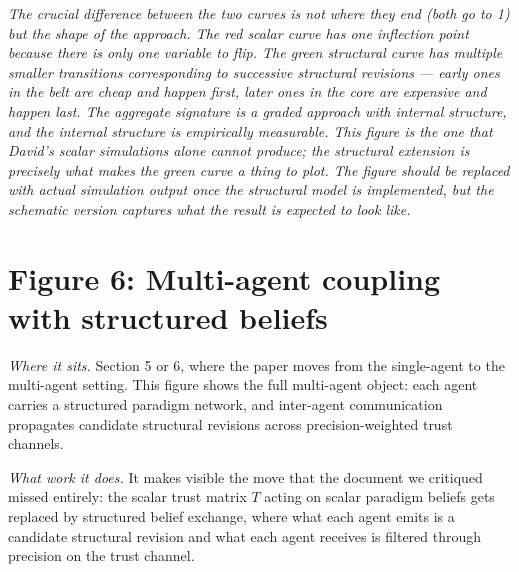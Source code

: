 \documentclass[11pt]{article}
\begin{document}
\noindent\textit{\textcolor{notegrey}{The crucial difference between the two curves is not where they end (both go to 1) but the shape of the approach. The red scalar curve has one inflection point because there is only one variable to flip. The green structural curve has multiple smaller transitions corresponding to successive structural revisions — early ones in the belt are cheap and happen first, later ones in the core are expensive and happen last. The aggregate signature is a graded approach with internal structure, and the internal structure is empirically measurable. This figure is the one that David's scalar simulations alone cannot produce; the structural extension is precisely what makes the green curve a thing to plot. The figure should be replaced with actual simulation output once the structural model is implemented, but the schematic version captures what the result is expected to look like.}}

\newpage
\section*{Figure 6: Multi-agent coupling with structured beliefs}

\textit{Where it sits.} Section 5 or 6, where the paper moves from the single-agent to the multi-agent setting. This figure shows the full multi-agent object: each agent carries a structured paradigm network, and inter-agent communication propagates candidate structural revisions across precision-weighted trust channels.

\textit{What work it does.} It makes visible the move that the document we critiqued missed entirely: the scalar trust matrix $T$ acting on scalar paradigm beliefs gets replaced by structured belief exchange, where what each agent emits is a candidate structural revision and what each agent receives is filtered through precision on the trust channel.
\end{document}

